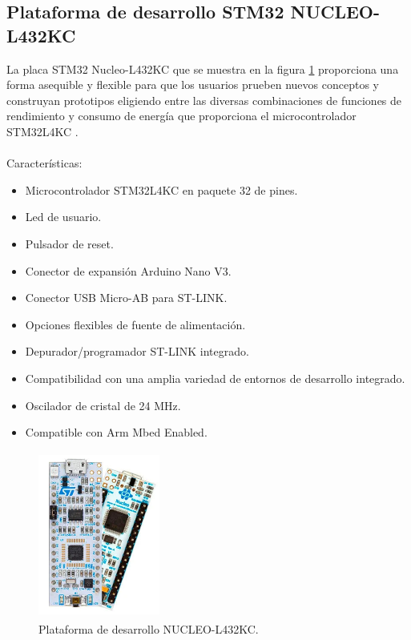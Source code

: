 \subsection{Plataforma de desarrollo STM32 NUCLEO-L432KC}
La placa STM32 Nucleo-L432KC que se muestra en la figura \ref{fig:nucleol432kc} proporciona una forma asequible y flexible para que los usuarios prueben nuevos conceptos y construyan prototipos eligiendo entre las diversas combinaciones de funciones de rendimiento y consumo de energía que proporciona el microcontrolador STM32L4KC \citep{NUCLEOL432KC}.
\\ 
\\ Características:
\begin{itemize}
	\item Microcontrolador STM32L4KC en paquete 32 de pines.
	\item Led de usuario.
	\item Pulsador de reset.
	\item Conector de expansión Arduino Nano V3.
	\item Conector USB Micro-AB para ST-LINK.
	\item Opciones flexibles de fuente de alimentación.
	\item Depurador/programador ST-LINK integrado.
	\item Compatibilidad con una amplia variedad de entornos de desarrollo integrado.
	\item Oscilador de cristal de 24 MHz.
	\item Compatible con Arm Mbed Enabled.  
\end{itemize}
\begin{figure}[htbp]
	\centering
	\includegraphics[width=4cm, height=5.5cm]{./Figures/nucleo-l432kc.jpg}
	\caption{Plataforma de desarrollo NUCLEO-L432KC\protect\footnotemark.}
	\label{fig:nucleol432kc}
\end{figure}
\vspace{5cm}
